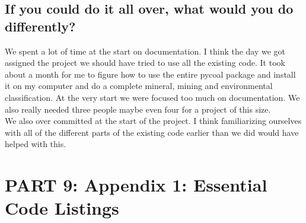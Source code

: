 \documentclass[onecolumn, draftclsnofoot,10pt, compsoc]{IEEEtran}
\begin{document}
\subsection{If you could do it all over, what would you do differently?}
We spent a lot of time at the start on documentation. I think the day we got assigned the project we should have tried to use all the existing code. It took about a month for me to figure how to use the entire pycoal package and install it on my computer and do a complete mineral, mining and environmental classification. At the very start we were focused too much on documentation. We also really needed three people maybe even four for a project of this size. 
\\
We also over committed at the start of the project. I think familiarizing ourselves with all of the different parts of the existing code earlier than we did would have helped with this. 

\section{PART 9: Appendix 1: Essential Code Listings}
\end{document}
